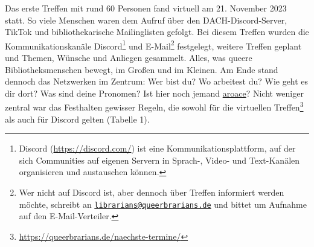 \documentclass[a4paper,
fontsize=11pt,
oneside,
numbers=noperiodatend,
parskip=half-,
bibliography=totoc,
final
]{scrartcl}
\begin{document}
Das erste Treffen mit rund 60 Personen fand virtuell am 21. November
2023 statt. So viele Menschen waren dem Aufruf über den
DACH-Discord-Server, TikTok und bibliothekarische Mailinglisten gefolgt.
Bei diesem Treffen wurden die Kommunikationskanäle Discord\footnote{Discord
  (\url{https://discord.com/}) ist eine Kommunikationsplattform, auf der
  sich Communities auf eigenen Servern in Sprach-, Video- und
  Text-Kanälen organisieren und austauschen können.} und
E-Mail\footnote{Wer nicht auf Discord ist, aber dennoch über Treffen
  informiert werden möchte, schreibt an
  \href{mailto:librarians@queerbrarians.de}{\nolinkurl{librarians@queerbrarians.de}}
  und bittet um Aufnahme auf den E-Mail-Verteiler.} festgelegt, weitere
Treffen geplant und Themen, Wünsche und Anliegen gesammelt. Alles, was
queere Bibliotheksmenschen bewegt, im Großen und im Kleinen. Am Ende
stand dennoch das Netzwerken im Zentrum: Wer bist du? Wo arbeitest du?
Wie geht es dir dort? Was sind deine Pronomen? Ist hier noch jemand
\href{https://lgbtqia.mywikis.wiki/wiki/Aroace}{aroace}? Nicht weniger
zentral war das Festhalten gewisser Regeln, die sowohl für die
virtuellen Treffen\footnote{\url{https://queerbrarians.de/naechste-termine/}}
als auch für Discord gelten (Tabelle 1).
\end{document}
